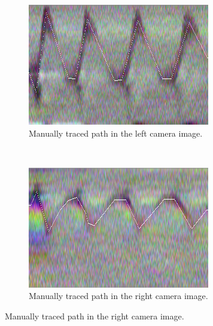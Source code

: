 \documentclass{article}
\begin{document}
\begin{figure}[htbp]
	\centering
	\begin{subfigure}[t]{0.45\textwidth}
		\includegraphics[width=\textwidth]{img/stereo_draw_1.png}
		\caption{Manually traced path in the left camera image.}
	\end{subfigure}
	~
	\begin{subfigure}[t]{0.45\textwidth}
		\includegraphics[width=\textwidth]{img/stereo_draw_2.png}
		\caption{Manually traced path in the right camera image.}
	\end{subfigure}


\end{figure}
\end{document}
